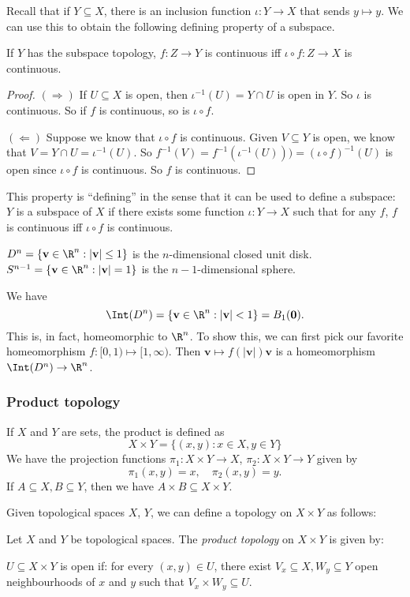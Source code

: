 \documentclass[a4paper]{article}
\begin{document}
Recall that if $Y\subseteq X$, there is an inclusion function $\iota: Y \to X$ that sends $y \mapsto y$. We can use this to obtain the following defining property of a subspace.
\begin{prop}
  If $Y$ has the subspace topology, $f: Z\to Y$ is continuous iff $\iota\circ f: Z\to X$ is continuous.
\end{prop}

\begin{proof}
  $(\Rightarrow)$ If $U\subseteq X$ is open, then $\iota^{-1}(U) = Y\cap U$ is open in $Y$. So $\iota$ is continuous. So if $f$ is continuous, so is $\iota\circ f$.

  $(\Leftarrow)$ Suppose we know that $\iota\circ f$ is continuous. Given $V\subseteq Y$ is open, we know that $V = Y \cap U = \iota^{-1}(U)$. So $f^{-1}(V) = f^{-1}(\iota^{-1}(U))) = (\iota\circ f)^{-1}(U)$ is open since $\iota\circ f$ is continuous. So $f$ is continuous.
\end{proof}
This property is ``defining'' in the sense that it can be used to define a subspace: $Y$ is a subspace of $X$ if there exists some function $\iota: Y \to X$ such that for any $f$, $f$ is continuous iff $\iota\circ f$ is continuous.

\begin{eg}
  $D^n = \{\mathbf{v}\in \R^n: |\mathbf{v}|\leq 1\}$ is the $n$-dimensional closed unit disk. $S^{n - 1} = \{\mathbf{v}\in \R^n: |\mathbf{v}| = 1\}$ is the $n - 1$-dimensional sphere.

  We have
  \[
    \Int(D^n) = \{\mathbf{v}\in \R^n : |\mathbf{v}| < 1\} = B_1(\mathbf{0}).
  \]
  This is, in fact, homeomorphic to $\R^n$. To show this, we can first pick our favorite homeomorphism $f: [0, 1) \mapsto [1, \infty)$. Then $\mathbf{v}\mapsto f(|\mathbf{v}|)\mathbf{v}$ is a homeomorphism $\Int(D^n) \to \R^n$.
\end{eg}
\subsubsection{Product topology}
If $X$ and $Y$ are sets, the product is defined as
\[
  X\times Y = \{(x, y): x\in X, y\in Y\}
\]
We have the projection functions $\pi_1: X\times Y \to X$, $\pi_2: X\times Y \to Y$ given by
\[
  \pi_1(x, y) = x,\quad \pi_2(x, y) = y.
\]
If $A\subseteq X, B\subseteq Y$, then we have $A\times B \subseteq X\times Y$.

Given topological spaces $X$, $Y$, we can define a topology on $X\times Y$ as follows:
\begin{defi}
  Let $X$ and $Y$ be topological spaces. The \emph{product topology} on $X\times Y$ is given by:

  $U\subseteq X\times Y$ is open if: for every $(x, y)\in U$, there exist $V_x\subseteq X, W_y\subseteq Y$ open neighbourhoods of $x$ and $y$ such that $V_x\times W_y \subseteq U$.
\end{defi}
\end{document}
